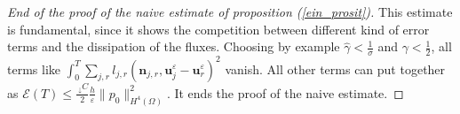 \documentclass[a4paper,french,english,10pt]{article}
\newcommand\eps{\varepsilon}
\begin{document}
\begin{proof}[End of the proof of the naive estimate of  proposition (\ref{ein_prosit})]
 This estimate is fundamental, since it 
shows the competition between different kind of error terms
and the dissipation of the fluxes.
Choosing by example $\widehat{\gamma}<\frac{1}{\sigma}$ and $\gamma<\frac12$, 
all terms like $ \int_0^T \sum_{j,r}l_{j,r}(\textbf{n}_{j,r},\textbf{u}_j^{\eps}-\textbf{u}
_r^{\eps})^2 $ vanish.
All other terms can put together as
%
$
\mathscr{E}(T)\leq
\frac{~_\downarrow C}2 \frac{h}{\varepsilon } 
\| p_0\|^2_{H^4(\Omega)}$. 
It ends the proof of the naive estimate.
\end{proof}
\end{document}
